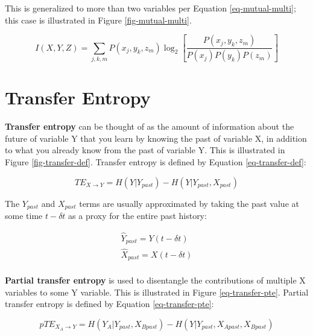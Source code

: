 
This is generalized to more than two variables per Equation
\ref{eq-mutual-multi}; this case is illustrated in Figure
\ref{fig-mutual-multi}.

\begin{equation}
I(X,Y,Z) = \sum_{j,k,m} P(x_j,y_k,z_m) \log_2 \left [
\frac{P(x_j,y_k,z_m)}{P(x_j) P(y_k) P(z_m)} \right ]
\label{eq-mutual-multi}
\end{equation}


\clearpage
%
\section{Transfer Entropy}
\label{sect-entropy-transfer}

\textbf{Transfer entropy} can be thought of as the amount of information
about the future of variable Y that you learn by knowing the past of
variable X, in addition to what you already know from the past of variable
Y. This is illustrated in Figure \ref{fig-transfer-def}. Transfer entropy
is defined by Equation \ref{eq-transfer-def}:

\begin{equation}
TE_{X \rightarrow Y} = H(Y|Y_{past}) - H(Y|Y_{past},X_{past})
\label{eq-transfer-def}
\end{equation}

The $Y_{past}$ and $X_{past}$ terms are usually approximated by taking the
past value at some time $t-\delta t$ as a proxy for the entire past history:

\begin{equation}
\begin{array}{cc}
\hat{Y}_{past} = Y(t - \delta t) \\
\hat{X}_{past} = X(t - \delta t) \\
\end{array}
\label{eq-transfer-past}
\end{equation}


\textbf{Partial transfer entropy} is used to disentangle the contributions
of multiple X variables to some Y variable. This is illustrated in Figure
\ref{eq-transfer-pte}. Partial transfer entropy is defined by Equation
\ref{eq-transfer-pte}:

\begin{equation}
pTE_{X_A \rightarrow Y} = H(Y_A|Y_{past},X_{Bpast})
- H(Y|Y_{past},X_{Apast},X_{Bpast})
\label{eq-transfer-pte}
\end{equation}

